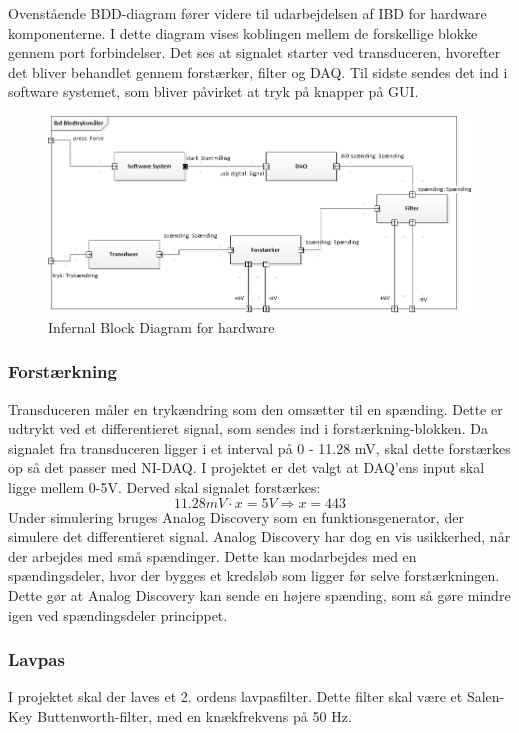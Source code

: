 Ovenstående BDD-diagram fører videre til udarbejdelsen af IBD for hardware komponenterne. I dette diagram vises koblingen mellem de forskellige blokke gennem port forbindelser.  Det ses at signalet starter ved transduceren, hvorefter det bliver behandlet gennem forstærker, filter og DAQ. Til sidste sendes det ind i software systemet, som bliver påvirket at tryk på knapper på GUI. 

\begin{figure}[H]
	\centering
	\includegraphics[width=1.0\textwidth]{Figurer/IBD}
	\caption{Infernal Block Diagram for hardware}
	\label{fig:IBD viser koblingen mellem blodtrykssystemets hardwaredele}
\end{figure}

\subsubsection{Forstærkning}
Transduceren måler en trykændring som den omsætter til en spænding. Dette er udtrykt ved et differentieret signal, som sendes ind i forstærkning-blokken. Da signalet fra transduceren ligger i et interval på 0 - 11.28 mV,  skal dette forstærkes op så det passer med NI-DAQ. I projektet er det valgt at DAQ'ens input skal ligge mellem 0-5V. Derved skal signalet forstærkes: 
\begin{equation}
11.28mV\cdot x = 5 V \Rightarrow x= 443
\end{equation}
Under simulering bruges Analog Discovery som en funktionsgenerator, der simulere det differentieret signal. Analog Discovery har dog en vis usikkerhed, når der arbejdes med små spændinger. Dette kan modarbejdes med en spændingsdeler, hvor der bygges et kredsløb som ligger før selve forstærkningen. Dette gør at Analog Discovery kan sende en højere spænding, som så gøre mindre igen ved spændingsdeler princippet.  

\subsubsection{Lavpas}
I projektet skal der laves et 2. ordens lavpasfilter. Dette filter skal være et Salen-Key Buttenworth-filter, med en knækfrekvens på 50 Hz. 

